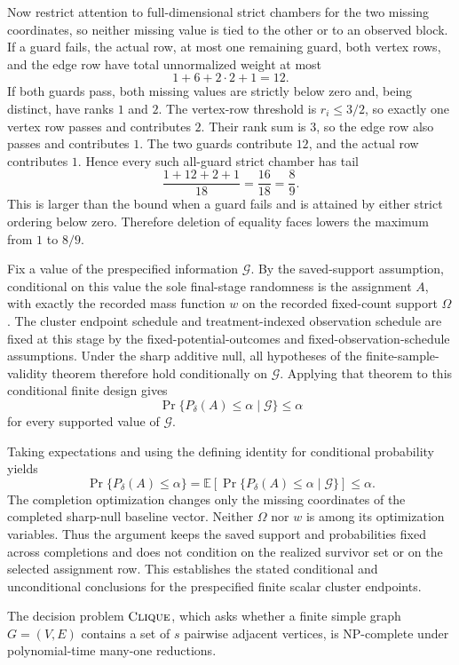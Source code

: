 Now restrict attention to full-dimensional strict chambers for the two missing coordinates, so neither missing value is tied to the other or to an observed block.  If a guard fails, the actual row, at most one remaining guard, both vertex rows, and the edge row have total unnormalized weight at most
\[
1+6+2\cdot2+1=12.
\]
If both guards pass, both missing values are strictly below zero and, being distinct, have ranks \(1\) and \(2\).  The vertex-row threshold is \(r_i\le3/2\), so exactly one vertex row passes and contributes \(2\).  Their rank sum is \(3\), so the edge row also passes and contributes \(1\).  The two guards contribute \(12\), and the actual row contributes \(1\).  Hence every such all-guard strict chamber has tail
\[
\frac{1+12+2+1}{18}=\frac{16}{18}=\frac89.
\]
This is larger than the bound when a guard fails and is attained by either strict ordering below zero.  Therefore deletion of equality faces lowers the maximum from \(1\) to \(8/9\).

Fix a value of the prespecified information \(\mathscr G\).  By the saved-support assumption, conditional on this value the sole final-stage randomness is the assignment \(A\), with exactly the recorded mass function \(w\) on the recorded fixed-count support \(\Omega\).  The cluster endpoint schedule and treatment-indexed observation schedule are fixed at this stage by the fixed-potential-outcomes and fixed-observation-schedule assumptions.  Under the sharp additive null, all hypotheses of the finite-sample-validity theorem therefore hold conditionally on \(\mathscr G\).  Applying that theorem to this conditional finite design gives
\[
\Pr\{P_\delta(A)\le\alpha\mid\mathscr G\}\le\alpha
\]
for every supported value of \(\mathscr G\).

Taking expectations and using the defining identity for conditional probability yields
\[
\Pr\{P_\delta(A)\le\alpha\}
=\mathbb E\!\left[
  \Pr\{P_\delta(A)\le\alpha\mid\mathscr G\}
 \right]
\le\alpha.
\]
The completion optimization changes only the missing coordinates of the completed sharp-null baseline vector.  Neither \(\Omega\) nor \(w\) is among its optimization variables.  Thus the argument keeps the saved support and probabilities fixed across completions and does not condition on the realized survivor set or on the selected assignment row.  This establishes the stated conditional and unconditional conclusions for the prespecified finite scalar cluster endpoints.

The decision problem \(\textsc{Clique}\), which asks whether a finite simple graph \(G=(V,E)\) contains a set of \(s\) pairwise adjacent vertices, is NP-complete under polynomial-time many-one reductions.

